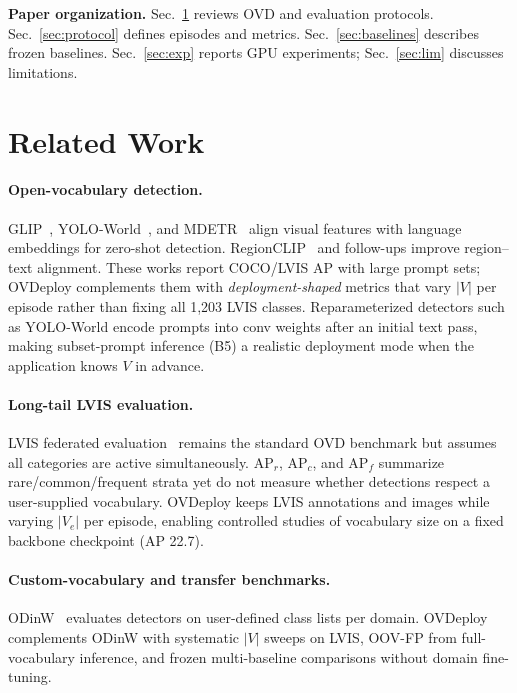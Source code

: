 \documentclass[10pt,twocolumn,letterpaper]{article}
\begin{document}
\textbf{Paper organization.}
Sec.~\ref{sec:related} reviews OVD and evaluation protocols.
Sec.~\ref{sec:protocol} defines episodes and metrics.
Sec.~\ref{sec:baselines} describes frozen baselines.
Sec.~\ref{sec:exp} reports GPU experiments; Sec.~\ref{sec:lim} discusses limitations.

\section{Related Work}
\label{sec:related}

\paragraph{Open-vocabulary detection.}
GLIP~\cite{li2022glip}, YOLO-World~\cite{cheng2024yoloworld}, and MDETR~\cite{kamath2021mdetr} align visual features with language embeddings for zero-shot detection.
RegionCLIP~\cite{zhong2022regionclip} and follow-ups improve region--text alignment.
These works report COCO/LVIS AP with large prompt sets; OVDeploy complements them with \emph{deployment-shaped} metrics that vary $|V|$ per episode rather than fixing all 1,203 LVIS classes.
Reparameterized detectors such as YOLO-World encode prompts into conv weights after an initial text pass, making subset-prompt inference (B5) a realistic deployment mode when the application knows $V$ in advance.

\paragraph{Long-tail LVIS evaluation.}
LVIS federated evaluation~\cite{gupta2019lvis} remains the standard OVD benchmark but assumes all categories are active simultaneously.
AP$_r$, AP$_c$, and AP$_f$ summarize rare/common/frequent strata yet do not measure whether detections respect a user-supplied vocabulary.
OVDeploy keeps LVIS annotations and images while varying $|V_e|$ per episode, enabling controlled studies of vocabulary size on a fixed backbone checkpoint (AP 22.7).

\paragraph{Custom-vocabulary and transfer benchmarks.}
ODinW~\cite{miller2021odinw} evaluates detectors on user-defined class lists per domain.
OVDeploy complements ODinW with systematic $|V|$ sweeps on LVIS, OOV-FP from full-vocabulary inference, and frozen multi-baseline comparisons without domain fine-tuning.
\end{document}
